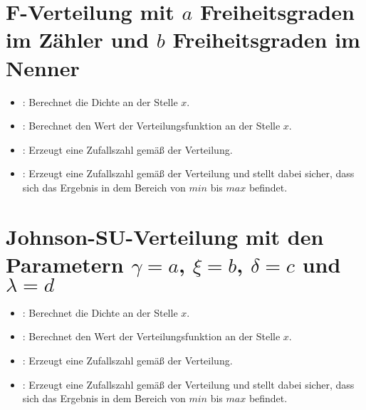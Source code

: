 \section{F-Verteilung mit \texorpdfstring{$a$}{a} Freiheitsgraden im Zähler und \texorpdfstring{$b$}{b} Freiheitsgraden im Nenner}

\begin{itemize}

\item
{}:
Berechnet die Dichte an der Stelle $x$.

\item
{}:
Berechnet den Wert der Verteilungsfunktion an der Stelle $x$.

\item
{}:
Erzeugt eine Zufallszahl gemäß der Verteilung.

\item
{}:
Erzeugt eine Zufallszahl gemäß der Verteilung und stellt dabei sicher, dass sich das Ergebnis in dem Bereich von $min$ bis $max$ befindet.

\end{itemize}



\section{Johnson-SU-Verteilung mit den Parametern \texorpdfstring{$\gamma=a$}{a}, \texorpdfstring{$\xi=b$}{b}, \texorpdfstring{$\delta=c$}{c} und \texorpdfstring{$\lambda=d$}{d}}

\begin{itemize}

\item
{}:
Berechnet die Dichte an der Stelle $x$.

\item
{}:
Berechnet den Wert der Verteilungsfunktion an der Stelle $x$.

\item
{}:
Erzeugt eine Zufallszahl gemäß der Verteilung.  

\item
{}:
Erzeugt eine Zufallszahl gemäß der Verteilung und stellt dabei sicher, dass sich das Ergebnis in dem Bereich von $min$ bis $max$ befindet.

\end{itemize}



